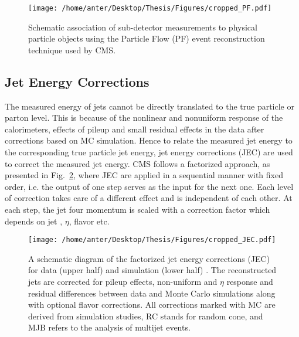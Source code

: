 \begin{figure}[!t]
 \begin{center}
 \vspace*{4mm} 
 \texttt{[image: /home/anter/Desktop/Thesis/Figures/cropped\_PF.pdf]}
 \vspace*{5mm}
 \caption{Schematic association of sub-detector measurements to physical particle objects using the Particle Flow (PF) event reconstruction technique used by CMS. \cite{Rabbertz:2017ssq}}
 \label{fig:PF_algo}
 \end{center}
\end{figure}

\subsection{Jet Energy Corrections}
\label{sec:jet_corrections}
The measured energy of jets cannot be directly translated to the true particle or parton level. This is because of the nonlinear and nonuniform response of the calorimeters, effects of pileup and small residual effects in the data after corrections based on MC simulation. Hence to relate the measured jet energy to the corresponding true particle jet energy, jet energy corrections (JEC) \cite{Chatrchyan:2011ds, Khachatryan:2016kdb} are used to correct the measured jet energy. CMS follows a factorized approach, as presented in Fig.~\ref{fig:jec}, where JEC are applied in a sequential manner with fixed order, i.e. the output of one step serves as the input for the next one. Each level of correction takes care of a different effect and is independent of each other. At each step, the jet four momentum is scaled with a correction factor which depends on jet \pt, $\eta$, flavor etc.

\begin{figure}[!h]
 \begin{center}
 \vspace*{4mm} 
 \texttt{[image: /home/anter/Desktop/Thesis/Figures/cropped\_JEC.pdf]}\\
 \vspace*{5mm}
 \caption[Lumi]{A schematic diagram of the factorized jet energy corrections (JEC) for data (upper half) and simulation (lower half) \cite{Khachatryan:2016kdb}. The reconstructed jets are corrected for pileup effects, non-uniform \pt and $\eta$ response and residual differences between data and Monte Carlo simulations along with optional flavor corrections. All corrections marked with MC are derived from simulation studies, RC stands for random cone, and MJB refers to the analysis of multijet events.}
 \label{fig:jec}
 \end{center}
\end{figure}

